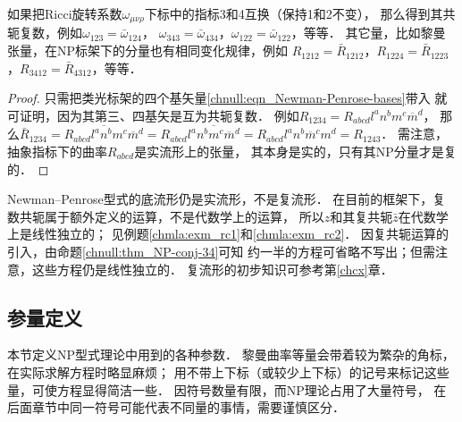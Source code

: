 \begin{proposition}\label{chnull:thm_NP-conj-34}
    如果把Ricci旋转系数$\omega_{\mu\nu\rho}$下标中的指标3和4互换（保持1和2不变），
    那么得到其共轭复数，例如$\omega_{123}=\bar{\omega}_{124}$，
    $\omega_{343}=\bar{\omega}_{434}$，$\omega_{122}=\bar{\omega}_{122}$，等等．
    其它量，比如黎曼张量，在NP标架下的分量也有相同变化规律，例如
    $R_{1212}=\bar{R}_{1212}$，$R_{1224}=\bar{R}_{1223}$，$R_{3412}=\bar{R}_{4312}$，等等．
\end{proposition}
\begin{proof}
    只需把类光标架的四个基矢量\eqref{chnull:eqn_Newman-Penrose-bases}带入
    就可证明，因为其第三、四基矢是互为共轭复数．
    例如$R_{1234}=R_{abcd}l^a n^b m^c \overline{m}^d $，
    那么$\bar{R}_{1234}=\overline{R_{abcd}l^a n^b m^c \overline{m}^d}
    =R_{abcd}\overline{l^a n^b m^c \overline{m}^d}
    =R_{abcd}l^a n^b \overline{m}^c {m}^d=R_{1243}$．
    需注意，抽象指标下的曲率$R_{abcd}$是实流形上的张量，
    其本身是实的，只有其NP分量才是复的．
\end{proof}
\begin{remark}
    Newman--Penrose型式的底流形仍是{\kaishu 实流形}，不是{\kaishu 复流形}．
    在目前的框架下，复数共轭属于额外定义的运算，不是{\kaishu 代数学}上的运算，
    所以$z$和其复共轭$\bar{z}$在代数学上是线性独立的；
    见例题\ref{chmla:exm_rc1}和\ref{chmla:exm_rc2}．
    因复共轭运算的引入，由命题\ref{chnull:thm_NP-conj-34}可知
    约一半的方程可省略不写出；但需注意，这些方程仍是线性独立的．
    复流形的初步知识可参考第\ref{chcx}章．    %
\end{remark}


\subsection{参量定义}
本节定义NP型式理论中用到的各种参数．
黎曼曲率等量会带着较为繁杂的角标，在实际求解方程时略显麻烦；
用不带上下标（或较少上下标）的记号来标记这些量，可使方程显得简洁一些．
因符号数量有限，而NP理论占用了大量符号，
在后面章节中同一符号可能代表不同量的事情，需要谨慎区分．


